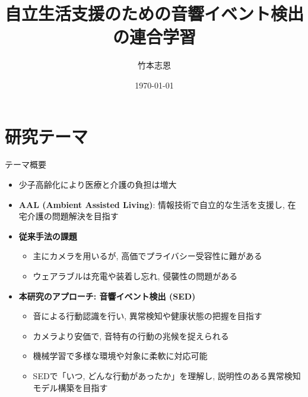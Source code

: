\documentclass[unicode,12pt,aspectratio=169,dvipdfmx]{beamer}
\title{\textbf{自立生活支援のための音響イベント検出の連合学習}}
\author{竹本志恩}
\date{\today}
\begin{document}
\begin{frame}
  \titlepage
\end{frame}

\section{研究テーマ}
\begin{frame}{テーマ概要}
    \begin{itemize}
        \item 少子高齢化により医療と介護の負担は増大
        \item \textbf{AAL (Ambient Assisted Living)}: 情報技術で自立的な生活を支援し, 在宅介護の問題解決を目指す
        \item \textbf{従来手法の課題}
        \begin{itemize}
            \item 主にカメラを用いるが, 高価でプライバシー受容性に難がある
            \item ウェアラブルは充電や装着し忘れ, 侵襲性の問題がある
        \end{itemize}
        \item \textbf{本研究のアプローチ: 音響イベント検出 (SED)}
        \begin{itemize}
            \item 音による行動認識を行い, 異常検知や健康状態の把握を目指す
            \item カメラより安価で, 音特有の行動の兆候を捉えられる
            \item 機械学習で多様な環境や対象に柔軟に対応可能
            \item SEDで「いつ, どんな行動があったか」を理解し, 説明性のある異常検知モデル構築を目指す
        \end{itemize}
    \end{itemize}
\end{frame}

\end{document}
